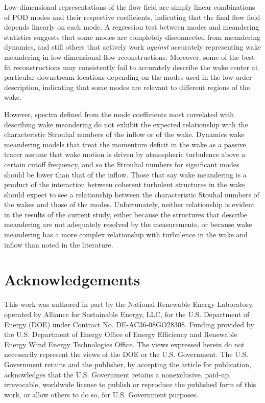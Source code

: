 \documentclass[%
 aip,
 amsmath,
 amssymb,
preprint,%
]{revtex4-2}
\begin{document}
Low-dimensional representations of the flow field are simply linear combinations of POD modes and their respective coefficients, indicating that the final flow field depends linearly on each mode.
A regression test between modes and meandering statistics suggests that some modes are completely disconnected from meandering dynamics, and still others that actively work \emph{against} accurately representing wake meandering in low-dimensional flow reconstructions.
Moreover, some of the best-fit reconstructions may consistently fail to accurately describe the wake center at particular downstream locations depending on the modes used in the low-order description, indicating that some modes are relevant to different regions of the wake.

However, spectra defined from the mode coefficients most correlated with describing wake meandering do not exhibit the expected relationship with the characteristic Strouhal numbers of the inflow or of the wake.
Dynamics wake meandering models that treat the momentum deficit in the wake as a passive tracer assume that wake motion is driven by atmospheric turbulence above a certain cutoff frequency, and so the Strouhal numbers for significant modes should be lower than that of the inflow.
Those that say wake meandering is a product of the interaction between coherent turbulent structures in the wake should expect to see a relationship between the characteristic Stouhal numbers of the wakes and those of the modes.
Unfortunately, neither relationship is evident in the results of the current study, either because the structures that describe meandering are not adequately resolved by the measurements, or because wake meandering has a more complex relationship with turbulence in the wake and inflow than noted in the literature.





\section*{Acknowledgements}

This work was authored in part by the National Renewable Energy Laboratory, operated by Alliance for Sustainable Energy, LLC, for the U.S. Department of Energy (DOE) under Contract No. DE-AC36-08GO28308. Funding provided by the U.S. Department of Energy Office of Energy Efficiency and Renewable Energy Wind Energy Technologies Office. The views expressed herein do not necessarily represent the views of the DOE or the U.S. Government. The U.S. Government retains and the publisher, by accepting the article for publication, acknowledges that the U.S. Government retains a nonexclusive, paid-up, irrevocable, worldwide license to publish or reproduce the published form of this work, or allow others to do so, for U.S. Government purposes. 



\end{document}

